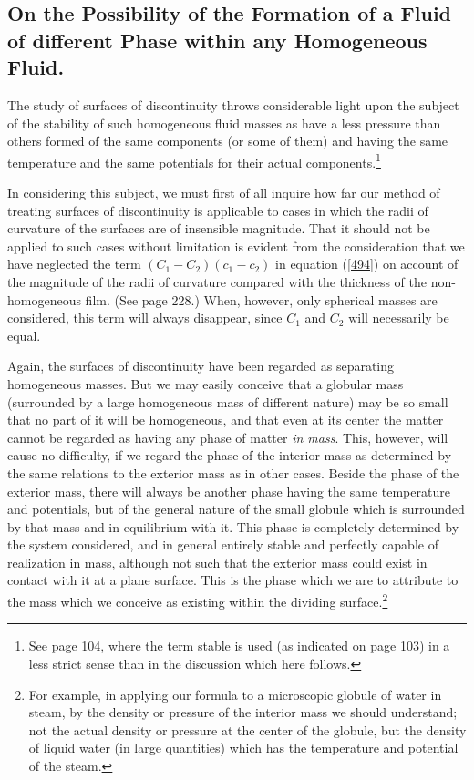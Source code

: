 \documentclass[12pt]{article}
\begin{document}
{\subsection{On the Possibility of the Formation of a Fluid of different Phase within any Homogeneous Fluid.}
The study of surfaces of discontinuity throws considerable light upon the subject of the stability of such homogeneous fluid masses as have a less pressure than others formed of the same components (or some of them) and having the same temperature and the same potentials for their actual components.\footnote{See page 104, where the term stable is used (as indicated on page 103) in a less strict sense than in the discussion which here follows.}

In considering this subject, we must first of all inquire how far our method of treating surfaces of discontinuity is applicable to cases in which the radii of curvature of the surfaces are of insensible magnitude. That it should not be applied to such cases without limitation is evident from the consideration that we have neglected the term  $(C_1-C_2) (c_1-c_2)$ in equation (\ref{494}) on account of the magnitude of the radii of curvature compared with the thickness of the non-homogeneous film. (See page 228.) When, however, only spherical masses are considered, this term will always disappear, since $C_1$ and $C_2$ will necessarily be equal.

Again, the surfaces of discontinuity have been regarded as separating homogeneous masses. But we may easily conceive that a globular mass (surrounded by a large homogeneous mass of different nature) may be so small that no part of it will be homogeneous, and that even at its center the matter cannot be regarded as having any phase of matter \textit{in mass}. This, however, will cause no difficulty, if we regard the phase of the interior mass as determined by the same relations to the exterior mass as in other cases. Beside the phase of the exterior mass, there will always be another phase having the same temperature and potentials, but of the general nature of the small globule which is surrounded by that mass and in equilibrium with it. This phase is completely determined by the system considered, and in general entirely stable and perfectly capable of realization in mass, although not such that the exterior mass could exist in contact with it at a plane surface. This is the phase which we are to attribute to the mass which we conceive as existing within the dividing surface.\footnote{For example, in applying our formula to a microscopic globule of water in steam, by the density or pressure of the interior mass we should understand; not the actual density or pressure at the center of the globule, but the density of liquid water (in large quantities) which has the temperature and potential of the steam.}

}
\end{document}
